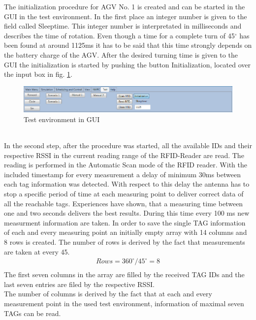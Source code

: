 The initialization procedure for AGV No. 1 is created and can be started in the GUI in the test environment. In the first place an integer number is given to the field called Sleeptime. This integer number is interpretated in milliseconds and describes the time of rotation. Even though a time for a complete turn of 45$^\circ$  has been found at around 1125ms it has to be said that this time strongly depends on the battery charge of the AGV. After the desired turning time is given to the GUI the initialization is started by pushing the button Initialization, located over the input box in fig.  \ref{Screenshot_Test_environment}.\\
\begin{figure}[!htbp]
\centering
\includegraphics[width = 16cm]{Pictures/Screenshot_Test_environment}
\caption{Test environment in GUI}
\label{Screenshot_Test_environment}
\end{figure}\\
In the second step, after the procedure was started, all the available IDs and their respective RSSI in the current reading range of the RFID-Reader are read. The reading is performed in the Automatic Scan mode of the RFID reader\cite{KTSSysteme.2017}. With the included timestamp for every measurement a delay of minimum 30ms between each tag information was detected. With respect to this delay the antenna has to stop a specific period of time at each measuring point to deliver correct data of all the reachable tags. Experiences have shown, that a measuring time between one and two seconds delivers the best results. During this time every 100 ms new measurment information are taken. In order to save the single TAG information of each and every measuring point an initially empty array with 14 columns and 8 rows is created. 
The number of rows is derived by the fact that measurements are taken at every 45\textdegree. \\
\begin{align}
Rows = 360^\circ/45^\circ = 8\\
\end{align}
The first seven columns in the array are filled by the received TAG IDs and the last seven entries are filed by the respective RSSI. \\
The number of columns is derived by the fact that at each and every measurement point in the used test environment, information of maximal seven TAGs can be read. \\
